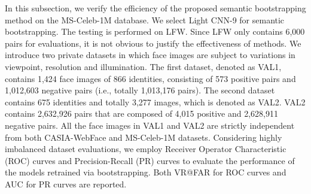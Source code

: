 \documentclass[journal,transmag]{IEEEtran}
\begin{document}
In this subsection, we verify the efficiency of the proposed semantic bootstrapping method on the MS-Celeb-1M database. We select Light CNN-9 for semantic bootstrapping. The testing is performed on LFW. Since LFW only contains 6,000 pairs for evaluations, it is not obvious to justify the effectiveness of methods. We introduce two private datasets in which face images are subject to variations in viewpoint, resolution and illumination.  The first dataset, denoted as VAL1, contains 1,424 face images of 866 identities, consisting of 573 positive pairs and 1,012,603 negative pairs (i.e., totally 1,013,176 pairs). The second dataset contains 675 identities and totally 3,277 images, which is denoted as VAL2. VAL2 contains 2,632,926 pairs that are composed of 4,015 positive and 2,628,911 negative pairs.
All the face images in VAL1 and VAL2 are strictly independent from both CASIA-WebFace and MS-Celeb-1M datasets. Considering highly imbalanced dataset evaluations, we employ Receiver Operator Characteristic (ROC) curves and Precision-Recall (PR) curves to evaluate the performance of the models retrained via bootstrapping. Both VR@FAR for ROC curves and AUC for PR curves are reported.
\end{document}
